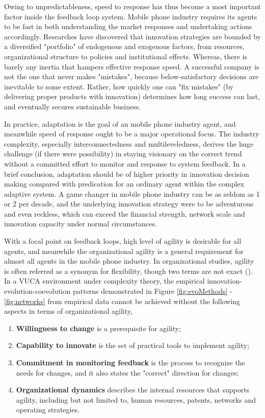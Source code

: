 \documentclass[utf8,english]{gradu3}
\begin{document}
Owing to unpredictableness, speed to response has thus become a most important factor inside the feedback loop system. Mobile phone industry requires its agents to be fast in both understanding the market responses and undertaking actions accordingly. Researches have discovered that innovation strategies are bounded by a diversified "portfolio" of endogenous and exogenous factors, from resources, organizational structure to policies and institutional effects. Whereas, there is barely any inertia that hampers effective response speed. A successful company is not the one that never makes "mistakes", because below-satisfactory decisions are  inevitable to some extent. Rather, how quickly one can "fix mistakes" (by delivering proper products with innovation) determines how long success can last, and eventually secures sustainable business.

In practice, adaptation is the goal of an mobile phone industry agent, and meanwhile speed of response ought to be a major operational focus. The industry complexity, especially interconnectedness and multileveledness, derives the huge challenge (if there were possibility) in staying visionary on the correct trend without a committed effort to monitor and response to system feedback. In a brief conclusion, adaptation should be of higher priority in innovation decision making compared with predication for an ordinary agent within the complex adaptive system. A game changer in mobile phone industry can be as seldom as 1 or 2 per decade, and the underlying innovation strategy were to be adventurous and even reckless, which can exceed the financial strength, network scale and innovation capacity under normal circumstances.

With a focal point on feedback loops, high level of agility is desirable for all agents, and meanwhile the organizational agility is a general requirement for almost all agents in the mobile phone industry. In organizational studies, agility is often referred as a synonym for flexibility, though two terms are not exact (\cite{teece2016dynamic}). In a VUCA environment under complexity theory, the empirical innovation-evolution-coevolution patterns demonstrated in Figure \ref{fig:evoMethods} - \ref{fig:networks} from empirical data cannot be achieved without the following aspects in terms of organizational agility,

\begin{enumerate}
\item \textbf{Willingness to change} is a prerequisite for agility; 
\item \textbf{Capability to innovate} is the set of practical tools to implement agility;
\item \textbf{Commitment in monitoring feedback} is the process to recognize the needs for changes, and it also states the "correct" direction for changes;
\item \textbf{Organizational dynamics} describes the internal resources that supports agility, including but not limited to, human resources, patents, networks and operating strategies. 
\end{enumerate}
\end{document}
